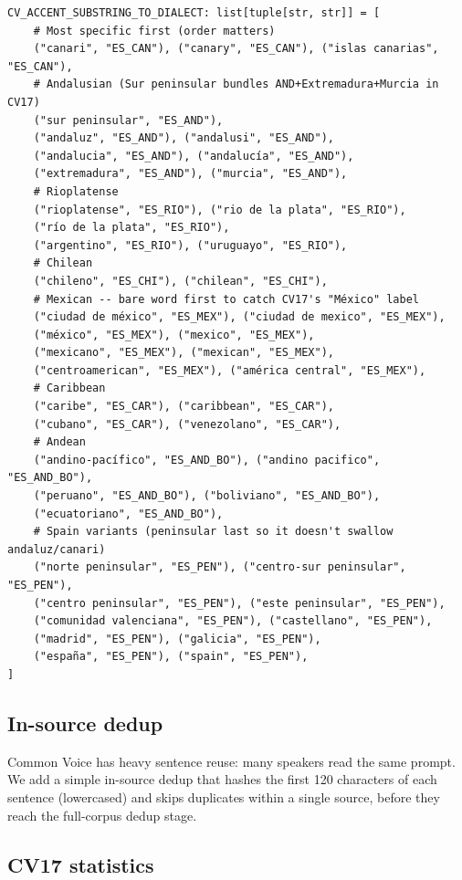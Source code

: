\documentclass[11pt,a4paper]{article}
\begin{document}
\begin{lstlisting}[style=pycode,caption={Expanded \texttt{CV\_ACCENT\_SUBSTRING\_TO\_DIALECT} rules (abridged).}]
CV_ACCENT_SUBSTRING_TO_DIALECT: list[tuple[str, str]] = [
    # Most specific first (order matters)
    ("canari", "ES_CAN"), ("canary", "ES_CAN"), ("islas canarias", "ES_CAN"),
    # Andalusian (Sur peninsular bundles AND+Extremadura+Murcia in CV17)
    ("sur peninsular", "ES_AND"),
    ("andaluz", "ES_AND"), ("andalusi", "ES_AND"),
    ("andalucia", "ES_AND"), ("andalucía", "ES_AND"),
    ("extremadura", "ES_AND"), ("murcia", "ES_AND"),
    # Rioplatense
    ("rioplatense", "ES_RIO"), ("rio de la plata", "ES_RIO"),
    ("río de la plata", "ES_RIO"),
    ("argentino", "ES_RIO"), ("uruguayo", "ES_RIO"),
    # Chilean
    ("chileno", "ES_CHI"), ("chilean", "ES_CHI"),
    # Mexican -- bare word first to catch CV17's "México" label
    ("ciudad de méxico", "ES_MEX"), ("ciudad de mexico", "ES_MEX"),
    ("méxico", "ES_MEX"), ("mexico", "ES_MEX"),
    ("mexicano", "ES_MEX"), ("mexican", "ES_MEX"),
    ("centroamerican", "ES_MEX"), ("américa central", "ES_MEX"),
    # Caribbean
    ("caribe", "ES_CAR"), ("caribbean", "ES_CAR"),
    ("cubano", "ES_CAR"), ("venezolano", "ES_CAR"),
    # Andean
    ("andino-pacífico", "ES_AND_BO"), ("andino pacifico", "ES_AND_BO"),
    ("peruano", "ES_AND_BO"), ("boliviano", "ES_AND_BO"),
    ("ecuatoriano", "ES_AND_BO"),
    # Spain variants (peninsular last so it doesn't swallow andaluz/canari)
    ("norte peninsular", "ES_PEN"), ("centro-sur peninsular", "ES_PEN"),
    ("centro peninsular", "ES_PEN"), ("este peninsular", "ES_PEN"),
    ("comunidad valenciana", "ES_PEN"), ("castellano", "ES_PEN"),
    ("madrid", "ES_PEN"), ("galicia", "ES_PEN"),
    ("españa", "ES_PEN"), ("spain", "ES_PEN"),
]
\end{lstlisting}

\subsection{In-source dedup}

Common Voice has heavy sentence reuse: many speakers read the same
prompt. We add a simple in-source dedup that hashes the first 120
characters of each sentence (lowercased) and skips duplicates within a
single source, before they reach the full-corpus dedup stage.

\subsection{CV17 statistics}
\end{document}
